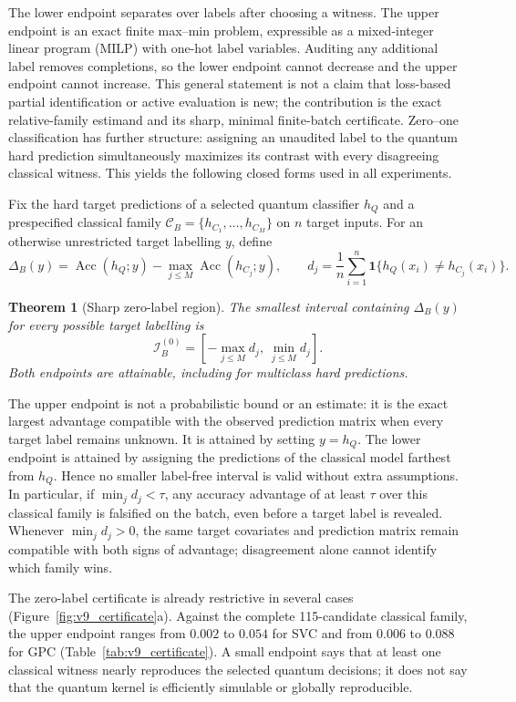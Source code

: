 \documentclass[referee,lineno,pdflatex,sn-vancouver-num]{sn-jnl}
\theoremstyle{thmstyleone}%
\newtheorem{theorem}{Theorem}%
\theoremstyle{thmstyletwo}%
\theoremstyle{thmstylethree}%
\begin{document}
The lower endpoint separates over labels after choosing a witness. The upper endpoint is an exact finite max--min problem, expressible as a mixed-integer linear program (MILP) with one-hot label variables. Auditing any additional label removes completions, so the lower endpoint cannot decrease and the upper endpoint cannot increase. This general statement is not a claim that loss-based partial identification or active evaluation is new; the contribution is the exact relative-family estimand and its sharp, minimal finite-batch certificate. Zero--one classification has further structure: assigning an unaudited label to the quantum hard prediction simultaneously maximizes its contrast with every disagreeing classical witness. This yields the following closed forms used in all experiments.

Fix the hard target predictions of a selected quantum classifier $h_Q$ and a prespecified classical family $\mathcal C_B=\{h_{C_1},\ldots,h_{C_M}\}$ on $n$ target inputs. For an otherwise unrestricted target labelling $y$, define
\[
\Delta_B(y)=\operatorname{Acc}(h_Q;y)-
             \max_{j\leq M}\operatorname{Acc}(h_{C_j};y),
\qquad
d_j=\frac{1}{n}\sum_{i=1}^{n}
\mathbf 1\{h_Q(x_i)\neq h_{C_j}(x_i)\}.
\]

\begin{theorem}[Sharp zero-label region]
\label{thm:zero_label}
The smallest interval containing $\Delta_B(y)$ for every possible target labelling is
\[
\mathcal I_B^{(0)}
=\left[-\max_{j\leq M}d_j,\ \min_{j\leq M}d_j\right].
\]
Both endpoints are attainable, including for multiclass hard predictions.
\end{theorem}

The upper endpoint is not a probabilistic bound or an estimate: it is the exact largest advantage compatible with the observed prediction matrix when every target label remains unknown. It is attained by setting $y=h_Q$. The lower endpoint is attained by assigning the predictions of the classical model farthest from $h_Q$. Hence no smaller label-free interval is valid without extra assumptions. In particular, if $\min_j d_j<\tau$, any accuracy advantage of at least $\tau$ over this classical family is falsified on the batch, even before a target label is revealed. Whenever $\min_jd_j>0$, the same target covariates and prediction matrix remain compatible with both signs of advantage; disagreement alone cannot identify which family wins.

The zero-label certificate is already restrictive in several cases (Figure~\ref{fig:v9_certificate}a). Against the complete 115-candidate classical family, the upper endpoint ranges from $0.002$ to $0.054$ for SVC and from $0.006$ to $0.088$ for GPC (Table~\ref{tab:v9_certificate}). A small endpoint says that at least one classical witness nearly reproduces the selected quantum decisions; it does not say that the quantum kernel is efficiently simulable or globally reproducible.
\end{document}
